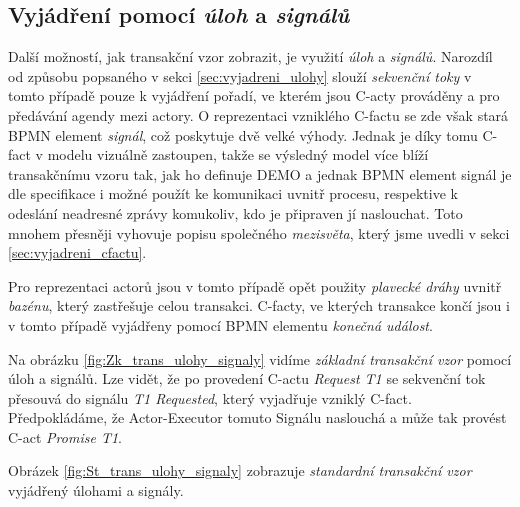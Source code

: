 \subsection{Vyjádření pomocí \textit{úloh} a \textit{signálů}} \label{sec:tr_vzor_ulohy_signaly}
Další možností, jak transakční vzor zobrazit, je využití \textit{úloh} a \textit{signálů}. Narozdíl od způsobu popsaného v sekci \ref{sec:vyjadreni_ulohy} slouží \textit{sekvenční toky} v tomto případě  pouze k vyjádření pořadí, ve kterém jsou C-acty prováděny a pro předávání agendy mezi actory. O reprezentaci vzniklého C-factu se zde však stará BPMN element \textit{signál}, což poskytuje dvě velké výhody. Jednak je díky tomu C-fact v modelu vizuálně zastoupen, takže se výsledný model více blíží transakčnímu vzoru tak, jak ho definuje DEMO a jednak BPMN element signál je dle specifikace \cite{Omg2011} i \cite{Silver2011} možné použít ke komunikaci uvnitř procesu, respektive k odeslání neadresné zprávy komukoliv, kdo je připraven jí naslouchat. Toto mnohem přesněji vyhovuje popisu společného \textit{mezisvěta}, který jsme uvedli v sekci \ref{sec:vyjadreni_cfactu}.

Pro reprezentaci actorů jsou v tomto případě opět použity \textit{plavecké dráhy} uvnitř \textit{bazénu}, který zastřešuje celou transakci. C-facty, ve kterých transakce končí jsou i v tomto případě vyjádřeny pomocí BPMN elementu \textit{konečná událost}.

Na obrázku \ref{fig:Zk_trans_ulohy_signaly} vidíme \textit{základní transakční vzor} pomocí úloh a signálů. Lze vidět, že po provedení C-actu \textit{Request T1} se sekvenční tok přesouvá do signálu \textit{T1 Requested}, který vyjadřuje vzniklý C-fact. Předpokládáme, že Actor-Executor tomuto Signálu naslouchá a může tak provést C-act \textit{Promise T1}.

Obrázek \ref{fig:St_trans_ulohy_signaly} zobrazuje \textit{standardní transakční vzor} vyjádřený úlohami a signály.

